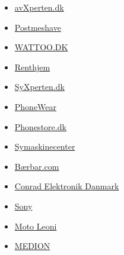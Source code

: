\documentclass[10pt]{IEEEtran}
\begin{document}
\begin{enumerate}
\begin{itemize}
		\item \href{http://www.trustpilot.dk/review/www.avxperten.dk}{avXperten.dk}
		\item \href{http://www.trustpilot.dk/review/www.postmeshave.dk}{Postmeshave}
		\item \href{http://www.trustpilot.dk/review/www.wattoo.dk}{WATTOO.DK}
		\item \href{http://www.trustpilot.dk/review/www.renthjem.dk}{Renthjem}
		\item \href{http://www.trustpilot.dk/review/www.syxperten-webshop.dk}{SyXperten.dk}
		\item \href{http://www.trustpilot.dk/review/www.phonewear.dk}{PhoneWear}
		\item \href{http://www.trustpilot.dk/review/www.phonestore.dk}{Phonestore.dk}
		\item \href{http://www.trustpilot.dk/review/www.symaskinecenter.dk}{Symaskinecenter}
		\item \href{http://www.trustpilot.dk/review/www.notebookonline.dk}{Bærbar.com}
		\item \href{http://www.trustpilot.dk/review/www.conradelektronik.dk}{Conrad Elektronik Danmark}
		\item \href{http://www.trustpilot.dk/review/www.sony.dk}{Sony}
		\item \href{http://www.trustpilot.dk/review/www.moto-leoni.dk}{Moto Leoni}
		\item \href{http://www.trustpilot.dk/review/www.medion.com}{MEDION}
	\end{itemize}
\end{enumerate}

\newpage
\end{document}
